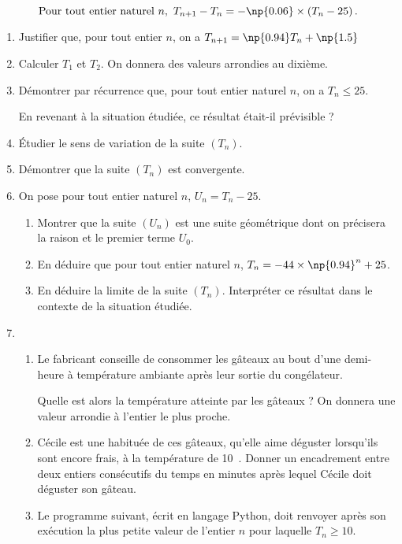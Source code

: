 \[\text{Pour tout entier naturel } n,\ T_{n+1}-T_n=-\np{0.06}\times \left(T_n - 25\right).\]
\begin{enumerate}
\item Justifier que, pour tout entier $n$, on a $T_{n+1}=\np{0.94}T_n + \np{1.5}$
\item Calculer $T_1$ et $T_2$. On donnera des valeurs arrondies au dixième.
\item Démontrer par récurrence que, pour tout entier naturel $n$, on a $T_n\leqslant 25$.

En revenant à la situation étudiée, ce résultat était-il prévisible ?
\item Étudier le sens de  variation de la suite $\left(T_n\right)$.
\item Démontrer que la suite $\left(T_n\right)$ est convergente.
\item On pose pour tout entier naturel $n$, $U_n = T_n - 25$.
\begin{enumerate}
\item Montrer que la suite $\left(U_n\right)$ est une suite géométrique dont on précisera la raison et le premier terme $U_0$.
\item En déduire que pour tout entier naturel $n$, $T_n=-44\times \np{0.94}^n+25$.
\item En déduire la limite de la suite $\left(T_n\right)$. Interpréter ce résultat dans le contexte de la situation étudiée.
\end{enumerate}
\item 
	\begin{enumerate}
		\item Le fabricant conseille de consommer les gâteaux au bout d'une demi-heure à température ambiante après leur sortie du congélateur.
		 
Quelle est alors la température atteinte par les gâteaux ? On donnera une valeur arrondie à l'entier le plus proche.
		\item Cécile est une habituée de ces gâteaux, qu'elle aime déguster lorsqu'ils sont encore frais, à la température de 10~\textcelsius.
Donner un encadrement entre deux entiers consécutifs du temps en minutes après lequel Cécile doit déguster son gâteau.

\item Le programme suivant, écrit en langage Python, doit renvoyer après son exécution
la plus petite valeur de l'entier $n$ pour laquelle $T_n \geqslant 10$.

\vspace{0.5cm}


\end{enumerate}
\end{enumerate}
